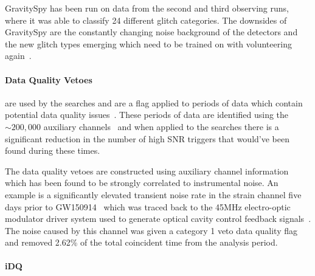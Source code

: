 GravitySpy has been run on data from the second and third observing runs, where it was able to classify 24 different glitch categories. The downsides of GravitySpy are the constantly changing noise background of the \gwadj detectors and the new glitch types emerging which need to be trained on with volunteering again~\cite{gravityspy:2023}.

\paragraph{Data Quality Vetoes}

are used by the \gwadj searches and are a flag applied to periods of data which contain potential data quality issues~\cite{DQ_vetoes:2017}. These periods of data are identified using the ${\sim}200,000$ auxiliary channels~\cite{DQ_vetoes:2017} and when applied to the searches there is a significant reduction in the number of high SNR triggers that would've been found during these times.

The data quality vetoes are constructed using auxiliary channel information which has been found to be strongly correlated to instrumental noise. An example is a significantly elevated transient noise rate in the strain channel five days prior to GW150914~\cite{GW150914:2016} which was traced back to the 45MHz electro-optic modulator driver system used to generate optical cavity control feedback signals~\cite{aLIGO:2015}. The noise caused by this channel was given a category 1 veto data quality flag and removed 2.62\% of the total coincident time from the analysis period.

\paragraph{iDQ}


